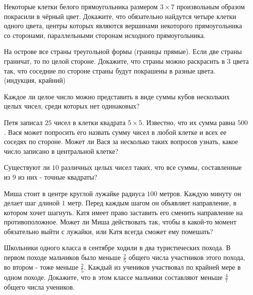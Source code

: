 \documentclass[12pt]{article}
\begin{document}
\begin{task}
Некоторые клетки белого прямоугольника размером $3 \times 7$ произвольным образом покрасили в чёрный цвет. Докажите, что обязательно найдутся четыре клетки одного цвета, центры которых являются вершинами некоторого прямоугольника со сторонами, параллельными сторонам исходного прямоугольника. 
\end{task}

\begin{task}
На острове все страны треугольной формы (границы прямые). Если две страны граничат, то по целой стороне. Докажите, что страны можно раскрасить в $3$ цвета так, что соседние по стороне страны будут покрашены в разные цвета. (индукция, крайний)
\end{task}

\begin{task}
Каждое ли целое число можно представить в виде суммы кубов нескольких целых чисел, среди которых нет одинаковых?
\end{task}

\begin{task}
Петя записал $25$ чисел в клетки квадрата $5 \times 5$. Известно, что их сумма равна $500$. Вася может попросить его назвать сумму чисел в любой клетке и всех ее соседях по
стороне. Может ли Вася за несколько таких вопросов узнать, какое число записано в центральной клетке?
\end{task}

\begin{task}
Существуют ли $10$ различных целых чисел таких, что все суммы, составленные из $9$ из них - точные квадраты?
\end{task}

\begin{task}
Миша стоит в центре круглой лужайке радиуса $100$ метров. Каждую минуту он делает шаг длиной $1$ метр. Перед каждым шагом он объявляет направление, в котором хочет шагнуть. Катя имеет право заставить его сменить направление на противоположное. Может ли Миша действовать так, чтобы в какой-то момент обязательно выйти с лужайки, или Катя всегда сможет ему помешать? 
\end{task}

\begin{task}
Школьники одного класса в сентябре ходили в два туристических похода. В первом походе мальчиков было меньше $\frac{2}{5}$ общего числа участников этого похода, во втором - тоже меньше $\frac{2}{5}$. Каждый из учеников участвовал по крайней мере в одном походе. Докажите, что в этом классе мальчики составляют меньше $\frac{4}{7}$ общего числа учеников.
\end{task}
\end{document}
